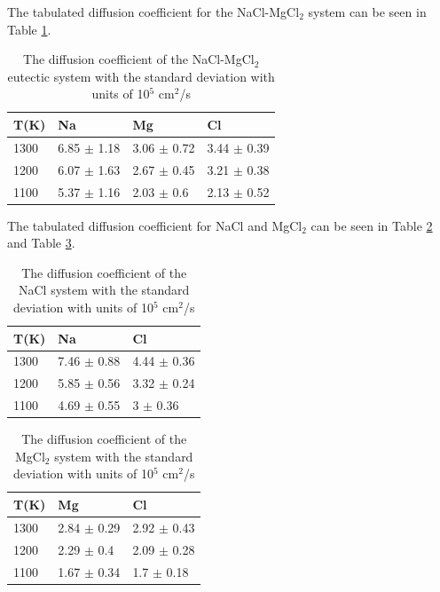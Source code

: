 \documentclass[review]{elsarticle}
\begin{document}
The tabulated diffusion coefficient for the NaCl-MgCl$_2$ system can be seen in Table \ref{Table: nacl-mgcl2_eut diffusion}.

\begin{table}[h]
\centering
\caption{The diffusion coefficient of the NaCl-MgCl$_2$ eutectic system with the standard deviation with units of 10$^5$ cm$^2$/s }
\begin{tabular}{llll}
\hline
T(K) & Na          & Mg          & Cl          \\
\hline
1300 & 6.85 $\pm$ 1.18 & 3.06 $\pm$ 0.72 & 3.44 $\pm$ 0.39 \\
1200 & 6.07 $\pm$ 1.63 & 2.67 $\pm$ 0.45 & 3.21 $\pm$ 0.38 \\
1100 & 5.37 $\pm$ 1.16 & 2.03 $\pm$ 0.6  & 2.13 $\pm$ 0.52 \\
\hline
\end{tabular}
\label{Table: nacl-mgcl2_eut diffusion}
\end{table}
\FloatBarrier

The tabulated diffusion coefficient for NaCl and MgCl$_2$ can be seen in Table \ref{Table: nacl diffusion} and Table \ref{Table: mgcl2 diffusion}.

\begin{table}[h!]
\centering
\caption{The diffusion coefficient of the NaCl system with the standard deviation with units of 10$^5$ cm$^2$/s }
\begin{tabular}{lll}
\hline
T(K) & Na          & Cl                   \\
\hline
1300 & 7.46 $\pm$ 0.88 & 4.44 $\pm$ 0.36\\
1200 & 5.85 $\pm$ 0.56 & 3.32 $\pm$ 0.24  \\
1100 & 4.69 $\pm$ 0.55 & 3 $\pm$ 0.36     \\
\hline
\end{tabular}
\label{Table: nacl diffusion}
\end{table}

\begin{table}[h!]
\centering
\caption{The diffusion coefficient of the MgCl$_2$ system with the standard deviation with units of 10$^5$ cm$^2$/s }
\begin{tabular}{lll}
\hline
T(K) & Mg          & Cl                \\
\hline
1300 & 2.84 $\pm$ 0.29 & 2.92 $\pm$ 0.43  \\
1200 & 2.29 $\pm$ 0.4  & 2.09 $\pm$ 0.28  \\
1100 & 1.67 $\pm$ 0.34 & 1.7 $\pm$ 0.18   \\
\hline
\end{tabular}
\label{Table: mgcl2 diffusion}
\end{table}
\FloatBarrier
\end{document}
